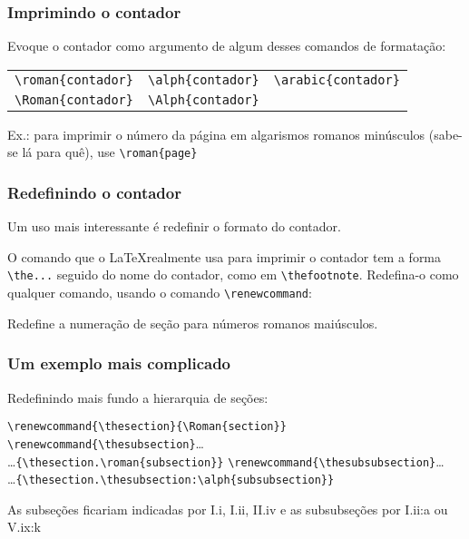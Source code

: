 \documentclass{beamer}
\begin{document}
\begin{frame}[fragile]
 \frametitle{Imprimindo o contador}

Evoque o contador como argumento de algum desses comandos de formatação:
\begin{tabular}{lll}
\verb!\roman{contador}! & \verb!\alph{contador}! & \verb!\arabic{contador}!  \\
\verb!\Roman{contador}! & \verb!\Alph{contador}! &
\end{tabular}
Ex.: para imprimir o número da página em algarismos romanos minúsculos (sabe-se lá para quê), use
\verb!\roman{page}!

\end{frame}

\begin{frame}[fragile]
 \frametitle{Redefinindo o contador}
Um uso mais interessante é redefinir o formato do contador. 

O comando que o \LaTeX realmente usa para imprimir o contador tem a forma \verb!\the...! seguido
do nome do contador, como em \verb!\thefootnote!. Redefina-o como qualquer comando, usando o comando \verb!\renewcommand!:

\begin{semiverbatim}
\renewcommand{\thesection}{\Roman{section}} 
\end{semiverbatim}

Redefine a numeração de seção para números romanos maiúsculos.

\end{frame}

\begin{frame}[fragile]
 \frametitle{Um exemplo mais complicado}

Redefinindo mais fundo a hierarquia de seções:

\begin{small}
\verb!\renewcommand{\thesection}{\Roman{section}}!
\verb!\renewcommand{\thesubsection}!\ldots\\
\hspace{100pt}\ldots \verb!{\thesection.\roman{subsection}}!
\verb!\renewcommand{\thesubsubsection}!\ldots\\
\hspace{30pt}\ldots\verb!{\thesection.\thesubsection:\alph{subsubsection}}!
\end{small}
\linebreak
As subseções ficariam indicadas por I.i, I.ii, II.iv e as subsubseções por I.ii:a ou V.ix:k

\end{frame}
\end{document}
